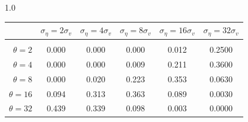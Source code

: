 \documentclass[12pt]{article}
\begin{document}
\begin{table}[h!]
\vspace{10pt}
\begin{subtable}{1.0\textwidth}
    \centering
\begin{tabular}{rccccc}
\hline  
            & \multicolumn{1}{l}{$\sigma_{\eta} =2\sigma_{v}$} & \multicolumn{1}{l}{$\sigma_{\eta} =4\sigma_{v}$} & \multicolumn{1}{l}{$\sigma_{\eta} =8\sigma_{v}$} & \multicolumn{1}{l}{$\sigma_{\eta} =16\sigma_{v}$} & \multicolumn{1}{l}{$\sigma_{\eta} =32\sigma_{v}$} \\ \hline  \vspace{-3mm} \\        
$\theta=2$  & 0.000                                             & 0.000                                             & 0.000                                             & 0.012                                              & 0.2500                                             \\ \hline
$\theta=4$  & 0.000                                             & 0.000                                             & 0.009                                             & 0.211                                              & 0.3600                                             \\ \hline
$\theta=8$  & 0.000                                             & 0.020                                             & 0.223                                             & 0.353                                              & 0.0630                                             \\ \hline
$\theta=16$ & 0.094                                             & 0.313                                             & 0.363                                             & 0.089                                              & 0.0030                                             \\ \hline
$\theta=32$ & 0.439                                             & 0.339                                             & 0.098                                             & 0.003                                              & 0.0000                                             \\ \hline
\end{tabular}
\end{subtable}


\end{table}
\end{document}
